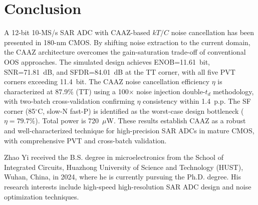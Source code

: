 \documentclass[journal]{IEEEtran}
\begin{document}
\section{Conclusion}

A 12-bit 10-MS/s SAR ADC with CAAZ-based $kT/C$ noise cancellation has been presented in 180-nm CMOS. By shifting noise extraction to the current domain, the CAAZ architecture overcomes the gain-saturation trade-off of conventional OOS approaches. The simulated design achieves ENOB=11.61~bit, SNR=71.81~dB, and SFDR=84.01~dB at the TT corner, with all five PVT corners exceeding 11.4~bit. The CAAZ noise cancellation efficiency $\eta$ is characterized at 87.9\% (TT) using a 100$\times$ noise injection double-$t_d$ methodology, with two-batch cross-validation confirming $\eta$ consistency within 1.4~p.p. The SF corner (85$^\circ$C, slow-N fast-P) is identified as the worst-case design bottleneck ($\eta=79.7\%$). Total power is 720~$\mu$W. These results establish CAAZ as a robust and well-characterized technique for high-precision SAR ADCs in mature CMOS, with comprehensive PVT and cross-batch validation.

\begin{IEEEbiography}{Zhao Yi} received the B.S. degree in microelectronics from the School of Integrated Circuits, Huazhong University of Science and Technology (HUST), Wuhan, China, in 2024, where he is currently pursuing the Ph.D. degree. His research interests include high-speed high-resolution SAR ADC design and noise optimization techniques.
\end{IEEEbiography}



\end{document}
